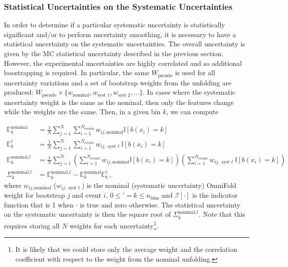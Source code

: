 \subsubsection{Statistical Uncertainties on the Systematic Uncertainties}

In order to determine if a particular systematic uncertainty is statistically significant and/or to perform uncertainty smoothing, it is necessary to have a statistical uncertainty on the systematic uncertainties.   The overall uncertainty is given by the MC statistical uncertainty described in the previous section.  However, the experimental uncertainties are highly correlated and so additional boostrapping is required.  In particular, the same $W_\text{pseudo}$ is used for all uncertainty variations and a set of bootstrap weights from the unfolding are produced: $W_\text{pseudo}\times\{w_\text{nominal},w_\text{syst 1}, w_\text{syst 2},...\}$.  In cases where the systematic uncertainty weight is the same as the nominal, then only the features change while the weights are the same.  Then, in a given bin $k$, we can compute 

\begin{align}
\mathbb{E}_k^\text{nominal} &= \frac{1}{N}\sum_{j=1}^N\sum_{i=1}^{N_\text{events}} w_{ij,\text{nominal}} \mathbb{I}[b(x_i)=k]\\
\mathbb{E}_k^\text{$\ell$} &= \frac{1}{N}\sum_{j=1}^N\sum_{i=1}^{N_\text{events}} w_{ij,\text{syst $\ell$}} \mathbb{I}[b(x_i)=k]\\
\mathbb{E}_{k}^\text{nominal,$\ell$} &= \frac{1}{N}\sum_{j=1}^N \left(\sum_{i=1}^{N_\text{events}} w_{ij,\text{nominal}}\mathbb{I}[b(x_i)=k]\right)\left(\sum_{i=1}^{N_\text{events}} w_{ij,\text{syst $\ell$}}\mathbb{I}[b(x_i)=k]\right)\\
\Sigma_{k}^\text{nominal,$\ell$}&=\mathbb{E}_{k}^\text{nominal,$\ell$}- \mathbb{E}_k^\text{nominal}\mathbb{E}_k^\text{$\ell$} \,,
\end{align}
where $w_{ij,\text{nominal}}$ ($w_{ij,\text{syst $\ell$}}$) is the nominal (systematic uncertainty) OmniFold weight for bootstrap $j$ and event $i$, $0\leq '=k\leq n_\text{bins}$ and $\mathcal{I}[\cdot]$ is the indicator function that is 1 when $\cdot$ is true and zero otherwise.   The statistical uncertainty on the systematic uncertainty is then the square root of $\Sigma_{k}^\text{nominal,$\ell$}$. Note that this requires storing all $N$ weights for each uncertainty\footnote{It is likely that we could store only the average weight and the correlation coefficient with respect to the weight from the nominal unfolding.}.

